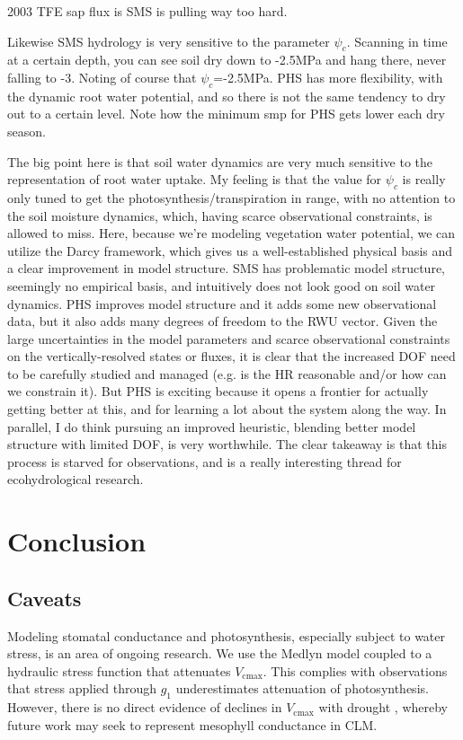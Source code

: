 \documentclass[draft,linenumbers]{agujournal}
\begin{document}
2003 TFE sap flux is 
SMS is pulling way too hard.

Likewise SMS hydrology is very sensitive to the parameter $\psi_c$. 
Scanning in time at a certain depth, you can see soil dry down to -2.5MPa and hang there, never falling to -3.
Noting of course that $\psi_c$=-2.5MPa.
PHS has more flexibility, with the dynamic root water potential, and so there is not the same tendency to dry out to a certain level.
Note how the minimum smp for PHS gets lower each dry season.

The big point here is that soil water dynamics are very much sensitive to the representation of root water uptake.
My feeling is that the value for $\psi_c$ is really only tuned to get the photosynthesis/transpiration in range, 
with no attention to the soil moisture dynamics, which, having scarce observational constraints, is allowed to miss.
Here, because we're modeling vegetation water potential, we can utilize the Darcy framework, which gives us a well-established physical basis and a clear improvement in model structure.
SMS has problematic model structure, seemingly no empirical basis, and intuitively does not look good on soil water dynamics.
PHS improves model structure and it adds some new observational data, but it also adds many degrees of freedom to the RWU vector. 
Given the large uncertainties in the model parameters and scarce observational constraints on the vertically-resolved states or fluxes, 
it is clear that the increased DOF need to be carefully studied and managed (e.g. is the HR reasonable and/or how can we constrain it).
But PHS is exciting because it opens a frontier for actually getting better at this, and for learning a lot about the system along the way.
In parallel, I do think pursuing an improved heuristic, blending better model structure with limited DOF, is very worthwhile.
The clear takeaway is that this process is starved for observations, and is a really interesting thread for ecohydrological research.

\section{Conclusion}

\subsection{Caveats}

    Modeling stomatal conductance and photosynthesis, especially subject to water stress, is an area of ongoing research.
    We use the Medlyn model coupled to a hydraulic stress function that attenuates $V_{\text{cmax}}$.
    This complies with observations \citep{lin2018,zhou2013} that stress applied through $g_1$ underestimates attenuation of photosynthesis.
    However, there is no direct evidence of declines in $V_{\text{cmax}}$ with drought \citep{flexas2006}, whereby future work may seek to represent mesophyll conductance in CLM.
    
\end{document}

